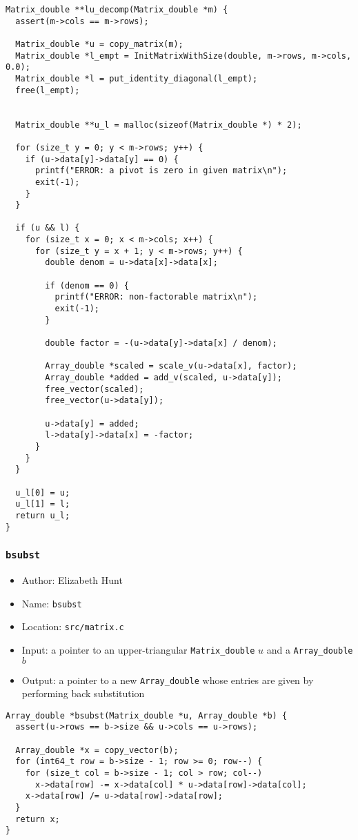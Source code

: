 \documentclass[11pt]{article}
\begin{document}
\begin{verbatim}
Matrix_double **lu_decomp(Matrix_double *m) {
  assert(m->cols == m->rows);

  Matrix_double *u = copy_matrix(m);
  Matrix_double *l_empt = InitMatrixWithSize(double, m->rows, m->cols, 0.0);
  Matrix_double *l = put_identity_diagonal(l_empt);
  free(l_empt);


  Matrix_double **u_l = malloc(sizeof(Matrix_double *) * 2);

  for (size_t y = 0; y < m->rows; y++) {
    if (u->data[y]->data[y] == 0) {
      printf("ERROR: a pivot is zero in given matrix\n");
      exit(-1);
    }
  }

  if (u && l) {
    for (size_t x = 0; x < m->cols; x++) {
      for (size_t y = x + 1; y < m->rows; y++) {
        double denom = u->data[x]->data[x];

        if (denom == 0) {
          printf("ERROR: non-factorable matrix\n");
          exit(-1);
        }

        double factor = -(u->data[y]->data[x] / denom);

        Array_double *scaled = scale_v(u->data[x], factor);
        Array_double *added = add_v(scaled, u->data[y]);
        free_vector(scaled);
        free_vector(u->data[y]);

        u->data[y] = added;
        l->data[y]->data[x] = -factor;
      }
    }
  }

  u_l[0] = u;
  u_l[1] = l;
  return u_l;
}
\end{verbatim}
\subsubsection{\texttt{bsubst}}
\label{sec:orgdeba296}
\begin{itemize}
\item Author: Elizabeth Hunt
\item Name: \texttt{bsubst}
\item Location: \texttt{src/matrix.c}
\item Input: a pointer to an upper-triangular \texttt{Matrix\_double} \(u\) and a \texttt{Array\_double}
\(b\)
\item Output: a pointer to a new \texttt{Array\_double} whose entries are given by performing
back substitution
\end{itemize}

\begin{verbatim}
Array_double *bsubst(Matrix_double *u, Array_double *b) {
  assert(u->rows == b->size && u->cols == u->rows);

  Array_double *x = copy_vector(b);
  for (int64_t row = b->size - 1; row >= 0; row--) {
    for (size_t col = b->size - 1; col > row; col--)
      x->data[row] -= x->data[col] * u->data[row]->data[col];
    x->data[row] /= u->data[row]->data[row];
  }
  return x;
}
\end{verbatim}
\end{document}
